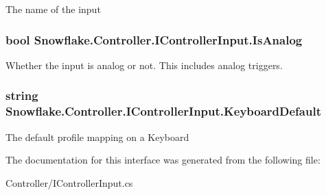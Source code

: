 The name of the input 

\hypertarget{interface_snowflake_1_1_controller_1_1_i_controller_input_a461bb3f22adf309804329b1fc92cee60}{}
\subsubsection[{Is\+Analog}]{\setlength{\rightskip}{0pt plus 5cm}bool Snowflake.\+Controller.\+I\+Controller\+Input.\+Is\+Analog\hspace{0.3cm}{\ttfamily [get]}}\label{interface_snowflake_1_1_controller_1_1_i_controller_input_a461bb3f22adf309804329b1fc92cee60}


Whether the input is analog or not. This includes analog triggers. 

\hypertarget{interface_snowflake_1_1_controller_1_1_i_controller_input_a9599c185a4863e50674e57b10f3ea2dc}{}
\subsubsection[{Keyboard\+Default}]{\setlength{\rightskip}{0pt plus 5cm}string Snowflake.\+Controller.\+I\+Controller\+Input.\+Keyboard\+Default\hspace{0.3cm}{\ttfamily [get]}}\label{interface_snowflake_1_1_controller_1_1_i_controller_input_a9599c185a4863e50674e57b10f3ea2dc}


The default profile mapping on a Keyboard 



The documentation for this interface was generated from the following file\+:\begin{DoxyCompactItemize}
\item 
Controller/I\+Controller\+Input.\+cs\end{DoxyCompactItemize}
